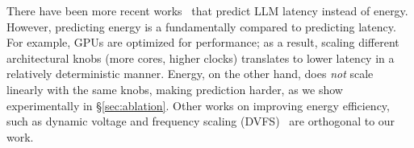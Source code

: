\smallskip

There have been more recent works~\cite{distsim, dpro,srifty, neusight,habitat,daydream} that predict LLM latency instead of energy. 
However, predicting energy is a fundamentally  compared to predicting latency. For example, GPUs are optimized for performance; as a result, scaling different architectural knobs (more cores, higher clocks) translates to lower latency in a relatively deterministic manner. Energy, on the other hand, does \emph{not} scale linearly with the same knobs, making prediction harder, as we show experimentally in \S\ref{sec:ablation}.
Other works on improving energy efficiency, such as dynamic voltage and frequency scaling (DVFS)~\cite{kakolyris2024sloawaregpufrequencyscaling,pccl} are orthogonal to our work. 

